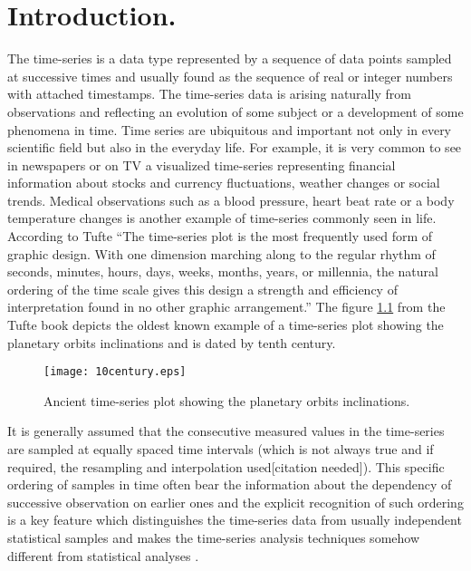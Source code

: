 \chapter{Introduction.}
The time-series is a data type represented by a sequence of data points sampled at successive times and usually found as the sequence of real or integer numbers with attached timestamps. The time-series data is arising naturally from observations and reflecting an evolution of some subject or a development of some phenomena in time. Time series are ubiquitous and important not only in every scientific field but also in the everyday life. For example, it is very common to see in newspapers or on TV a visualized time-series representing financial information about stocks and currency fluctuations, weather changes or social trends. Medical observations such as a blood pressure, heart beat rate or a body temperature changes is another example of time-series commonly seen in life. According to Tufte \cite{citeulike:1454223} ``The time-series plot is the most frequently used form of graphic design. With one dimension marching along to the regular rhythm of seconds, minutes, hours, days, weeks, months, years, or millennia, the natural ordering of the time scale gives this design a strength and efficiency of interpretation found in no other graphic arrangement.'' The figure \ref{fig:10century} from the Tufte book depicts the oldest known example of a time-series plot showing the planetary orbits inclinations and is dated by tenth century.
\begin{figure}[tbp]
   \centering
   \texttt{[image: 10century.eps]}
   \caption{Ancient time-series plot showing the planetary orbits inclinations.}
   \label{fig:10century}
\end{figure} 
It is generally assumed that the consecutive measured values in the time-series are sampled at equally spaced time intervals (which is not always true and if required, the resampling and interpolation used[citation needed]). This specific ordering of samples in time often bear the information about the dependency of successive observation on earlier ones and the explicit recognition of such ordering is a key feature which distinguishes the time-series data from usually independent statistical samples and makes the time-series analysis techniques somehow different from statistical analyses \cite{citeulike:3989988}. 

